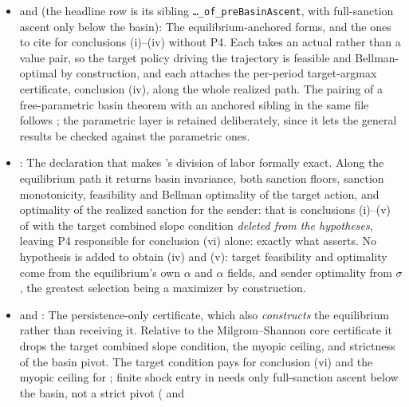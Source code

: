 \begin{itemize}[leftmargin=1.4em,itemsep=1pt]
from interval dominance, exactly as  splits
them.
\item {} and
 (the
headline row is its sibling \texttt{\ldots\_of\_preBasinAscent}, with
full-sanction ascent only below the basin):
The equilibrium-anchored forms, and the ones to cite for
 conclusions (i)--(iv) without P4. Each takes an
actual  rather than a
value pair, so the target policy driving the trajectory is feasible
and Bellman-optimal by construction, and each attaches the per-period
target-argmax certificate, conclusion (iv), along the whole
realized path. The pairing
of a free-parametric basin theorem with an anchored sibling in the same
file follows
;
the parametric layer is retained deliberately, since it lets the
general results be checked against the parametric ones.
\item {}:
The declaration that makes 's division of labor
formally exact. Along the equilibrium path it returns basin invariance,
both sanction floors, sanction monotonicity, feasibility and Bellman
optimality of the target action, and optimality of the realized sanction
for the sender: that is conclusions (i)--(v) of 
with the target combined slope condition \emph{deleted from the hypotheses},
leaving P4 responsible for conclusion (vi) alone: exactly what
 asserts. No hypothesis is added to obtain (iv) and
(v): target feasibility and optimality come from the equilibrium's own
$\alpha$ and $\alpha$ fields, and sender optimality from
$\sigma$, the greatest selection being a maximizer by
construction.
\item {} and
: The persistence-only
certificate, which also \emph{constructs} the equilibrium
rather than receiving it. Relative to the Milgrom--Shannon core
certificate it drops the target combined slope condition, the myopic ceiling, and
strictness of the basin pivot. The target condition pays for conclusion (vi)
and the myopic ceiling for ; finite shock entry in
 needs only full-sanction ascent below the basin, not a
strict pivot ( and

\end{itemize}
